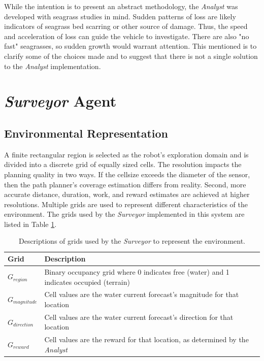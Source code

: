 \documentclass{tamuccthesis}
\begin{document}
While the intention is to present an abstract methodology, the \textit{Analyst} was developed with seagrass studies in mind. Sudden patterns of loss are likely indicators of seagrass bed scarring or other source of damage. Thus, the speed and acceleration of loss can guide the vehicle to investigate. There are also "no fast" seagrasses, so sudden growth would warrant attention. This mentioned is to clarify some of the choices made and to suggest that there is not a single solution to the \textit{Analyst} implementation. 

\section{\textit{Surveyor} Agent}

\subsection{Environmental Representation}

A finite rectangular region is selected as the robot's exploration domain and is divided into a discrete grid of equally sized cells. The resolution impacts the planning quality in two ways. If the cellsize exceeds the diameter of the sensor, then the path planner's coverage estimation differs from reality. Second, more accurate distance, duration, work, and reward estimates are achieved at higher resolutions. Multiple grids are used to represent different characteristics of the environment. The grids used by the \textit{Surveyor} implemented in this system are listed in Table \ref{tbl:grids}. 

\begin{table}[H]\small
\begin{tabular}{|l|l|}
\hline
Grid            & Description \\
\hline
$G_{region}$    & Binary occupancy grid where 0 indicates free (water) and 1 indicates occupied (terrain) \\
\hline
$G_{magnitude}$ & Cell values are the water current forecast's magnitude for that location \\
\hline
$G_{direction}$ & Cell values are the water current forecast's direction for that location \\
\hline
$G_{reward}$    & Cell values are the reward for that location, as determined by the \textit{Analyst} \\    
\hline
\end{tabular}
\caption{Descriptions of grids used by the \textit{Surveyor} to represent the environment.}
\label{tbl:grids}
\end{table}
\end{document}
